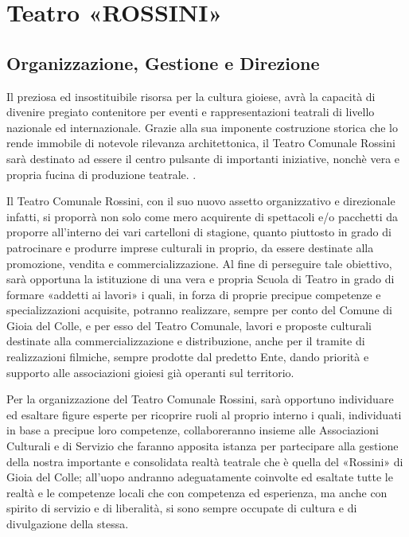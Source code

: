 \documentclass[a4paper,14pt,italian]{sphinxmanual}
\begin{document}
\section{Teatro «ROSSINI»}
\label{\detokenize{cultura:teatro-rossini}}


\subsection{Organizzazione, Gestione e Direzione}
\label{\detokenize{cultura:organizzazione-gestione-e-direzione}}
Il  preziosa ed insostituibile risorsa per la cultura gioiese, avrà la capacità di divenire pregiato contenitore per eventi e rappresentazioni teatrali di livello nazionale ed internazionale.
Grazie alla sua imponente costruzione storica che lo rende immobile di notevole rilevanza architettonica, il Teatro Comunale Rossini sarà destinato ad essere il centro pulsante di importanti iniziative, nonchè vera e propria fucina di produzione teatrale. .

Il Teatro Comunale Rossini, con il suo nuovo assetto organizzativo e direzionale infatti, si proporrà non solo come mero acquirente di spettacoli e/o pacchetti da proporre all’interno dei vari cartelloni di stagione, quanto piuttosto in grado di patrocinare e produrre imprese culturali in proprio, da essere destinate alla promozione, vendita e commercializzazione.
Al fine di perseguire tale obiettivo, sarà opportuna la istituzione di una vera e propria Scuola di Teatro in grado di formare «addetti ai lavori» i quali, in forza di proprie precipue competenze e specializzazioni acquisite, potranno realizzare, sempre per conto del Comune di Gioia del Colle, e per esso del Teatro Comunale, lavori e proposte culturali destinate alla commercializzazione e distribuzione, anche per il tramite di realizzazioni filmiche, sempre prodotte dal predetto Ente, dando priorità e supporto alle associazioni gioiesi già operanti sul territorio.

Per la organizzazione del Teatro Comunale Rossini, sarà opportuno individuare ed esaltare figure esperte per ricoprire ruoli al proprio interno i quali, individuati in base a precipue loro competenze, collaboreranno insieme alle Associazioni Culturali e di Servizio che faranno apposita istanza per partecipare alla gestione della nostra importante e consolidata realtà teatrale che è quella del «Rossini» di Gioia del Colle; all’uopo andranno adeguatamente coinvolte ed esaltate tutte le realtà e le competenze locali che con competenza ed esperienza, ma anche con spirito di servizio e di liberalità, si sono sempre occupate di cultura e di divulgazione della stessa.
\end{document}
